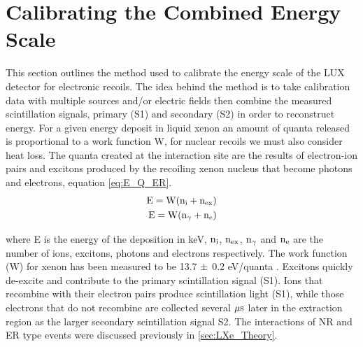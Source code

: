 \renewcommand{\thechapter}{4}

\chapter{Calibrating the Combined Energy Scale}
\label{Ch:E_Scale_Cal}

This section outlines the method used to calibrate the energy scale of the LUX detector for electronic recoils. The idea behind the method is to take calibration data with multiple sources and/or electric fields then combine the measured scintillation signals, primary (S1) and secondary (S2) in order to reconstruct energy. For a given energy deposit in liquid xenon an amount of quanta released is proportional to a work function W, for nuclear recoils we must also consider heat loss. The quanta created at the interaction site are the results of electron-ion pairs and excitons produced by the recoiling xenon nucleus that become photons and electrons, equation \ref{eq:E_Q_ER}.
\begin{equation}
\begin{split}
\rm E= W (n_i + n_{ex}) \\
\rm E= W (n_\gamma + n_e)  \\
\label{eq:E_Q_ER}
\end{split}
\end{equation}

\noindent where E is the energy of the deposition in keV, $\rm n_i$, $\rm n_{ex}$, $\rm n_\gamma$ and $\rm n_e$ are the number of ions, excitons, photons and electrons respectively. The work function (W) for xenon has been measured to be 13.7 $\rm \pm$ 0.2  eV/quanta  \cite{Dahl_Thesis}.
Excitons quickly de-excite and contribute to the primary scintillation signal (S1). Ions that recombine with their electron pairs produce scintillation light (S1), while those electrons that do not recombine are collected several $\rm \mu s$ later in the extraction region as the larger secondary scintillation signal S2. The interactions of NR and ER type events were discussed previously in \ref{sec:LXe_Theory}.


